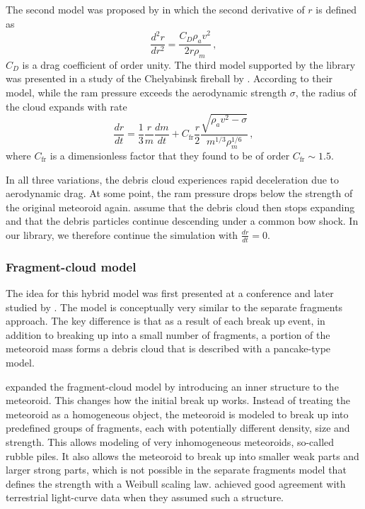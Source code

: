 The second model was proposed by \cite{chyba1993tunguska} in which the second derivative of $r$ is defined as
\begin{equation}
    \frac{d^2r}{dr^2} = \frac{C_D \rho_a v^2}{2r\rho_m}\,,
    \label{eq:PM}
\end{equation}
$C_D$ is a drag coefficient of order unity. The third model supported by the library was presented in a study of the Chelyabinsk fireball by \cite{avramenko2014simulation}. According to their model, while the ram pressure exceeds the aerodynamic strength $\sigma$, the radius of the cloud expands with rate
\begin{equation}
    \frac{dr}{dt} = \frac{1}{3}\frac{r}{m} \frac{dm}{dt} +  C_\mathrm{fr} \frac{r}{2} \frac{\sqrt{\rho_a v^2 - \sigma}}{m^{1/3}\rho_m^{1/6}}\,,
    \label{eq:CRM}
\end{equation}
where $C_\mathrm{fr}$ is a dimensionless factor that they found to be of order $C_\mathrm{fr} \sim 1.5$.

In all three variations, the debris cloud experiences rapid deceleration due to aerodynamic drag. At some point, the ram pressure drops below the strength of the original meteoroid again. \cite{hills1998damage} assume that the debris cloud then stops expanding and that the debris particles continue descending under a common bow shock. In our library, we therefore continue the simulation with $\frac{dr}{dt} = 0$.

\subsubsection{Fragment-cloud model}
\label{sec:fragment_cloud_model}
The idea for this hybrid model was first presented at a conference \citep{mehta2015break} and later studied by \cite{wheeler2017fragmentcloud}.
The model is conceptually very similar to the separate fragments approach.
The key difference is that as a result of each break up event, in addition to breaking up into a small number of fragments, a portion of the meteoroid mass forms a debris cloud that is described with a pancake-type model.

\cite{wheeler2018atmospheric} expanded the fragment-cloud model by introducing an inner structure to the meteoroid. This changes how the initial break up works. Instead of treating the meteoroid as a homogeneous object, the meteoroid is modeled to break up into predefined groups of fragments, each with potentially different density, size and strength. This allows modeling of very inhomogeneous meteoroids, so-called rubble piles. It also allows the meteoroid to break up into smaller weak parts and larger strong parts, which is not possible in the separate fragments model that defines the strength with a Weibull scaling law. \cite{wheeler2018atmospheric} achieved good agreement with terrestrial light-curve data when they assumed such a structure.

